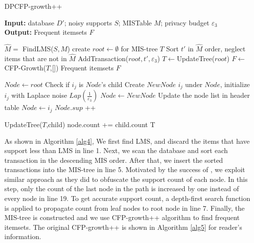 \documentclass[conference]{IEEEtran}
\begin{document}
\begin{algorithm}[htbp]
    \caption{DPCFP-growth++}
    \hspace*{0.02in} {\bf Input:} %
    database $D'$; noisy supports $S$; MISTable $M$; privacy budget $\varepsilon_3$\\
    \hspace*{0.02in} {\bf Output:} %
    Frequent itemsets $F$
    
    \begin{algorithmic}[1]
        \State $\hat{M} =$ FindLMS($S,M$)
        \State create $root\leftarrow\emptyset$ for MIS-tree $T$
        \State Sort $t'$ in $\hat{M}$ order, neglect items that are not in $\hat{M}$
        \State AddTransaction($root,t',\varepsilon_3$)
        \EndFor
        \State $T\leftarrow$UpdateTree($root$) 
        \State $F\leftarrow$CFP-Growth($T$,[])
    \State \Return Frequent itemsets $F$

    \State $Node \leftarrow root$
    \State Check if $i_j$ is $Node$'s child
        \State Create $NewNode$ $i_j$ under $Node$, 
        \State initialize $i_j$ with Laplace noise $Lap(\frac{1}{\varepsilon_3})$
        \State $Node\leftarrow NewNode$
        \State Update the node list in header table  
    \Else
        \State $Node\leftarrow i_j$
    \EndIf
    \EndFor
    \State $Node.sup$ ++
    \EndFunction 

        \State UpdateTree($T$,child)
        \State node.count += child.count
    \EndFor
    \State \Return T
    \EndFunction
    \end{algorithmic} 
    \label{alg4}
\end{algorithm}

As shown in Algorithm \ref{alg4}, We first find LMS, and discard the items that have support less than LMS in line 1. 
Next, we scan the database and sort each transaction in the descending MIS order. 
After that, we insert the sorted transactions into the MIS-tree in line 5. 
Motivated by the success of \cite{b8}, we exploit similar approach as they did to obfuscate the support count of each node. 
In this step, only the count of the last node in the path is increased by one instead of every node in line 19. 
To get accurate support count, a depth-first search function is applied to propagate count from leaf nodes to root node in line 7. 
Finally, the MIS-tree is constructed and we use CFP-growth++ algorithm to find frequent itemsets. 
The original CFP-growth++ is shown in Algorithm \ref{alg5} for reader's information.
\end{document}
